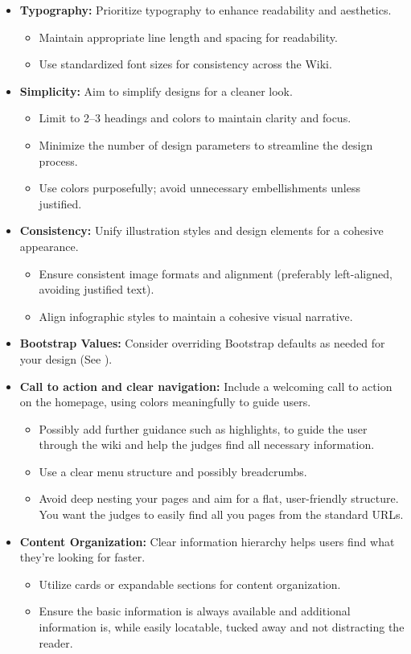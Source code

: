 \begin{itemize}
    \item \textbf{Typography:} Prioritize typography to enhance readability and aesthetics.
    \begin{itemize}
        \item Maintain appropriate line length and spacing for readability.
        \item Use standardized font sizes for consistency across the Wiki.
    \end{itemize}
    \item \textbf{Simplicity:} Aim to simplify designs for a cleaner look.
    \begin{itemize}
        \item Limit to 2--3 headings and colors to maintain clarity and focus.
        \item Minimize the number of design parameters to streamline the design process.
        \item Use colors purposefully; avoid unnecessary embellishments unless justified.
    \end{itemize}
    \item \textbf{Consistency:} Unify illustration styles and design elements for a cohesive appearance.
    \begin{itemize}
        \item Ensure consistent image formats and alignment (preferably left-aligned, avoiding justified text).
        \item Align infographic styles to maintain a cohesive visual narrative.
    \end{itemize}
    \item \textbf{Bootstrap Values:} Consider overriding Bootstrap defaults as needed for your design (See ).
    \item \textbf{Call to action and clear navigation:} Include a welcoming call to action on the homepage, using colors meaningfully to guide users.
    \begin{itemize}
        \item Possibly add further guidance such as highlights, to guide the user through the wiki and help the judges find all necessary information.
        \item Use a clear menu structure and possibly breadcrumbs.
        \item Avoid deep nesting your pages and aim for a flat, user-friendly structure.
        You want the judges to easily find all you pages from the standard URLs.
    \end{itemize}
    \item \textbf{Content Organization:} Clear information hierarchy helps users find what they’re looking for faster.
    \begin{itemize}
        \item Utilize cards or expandable sections for content organization.
        \item Ensure the basic information is always available and additional information is, while easily locatable, tucked away and not distracting the reader.
    \end{itemize}
\end{itemize}
